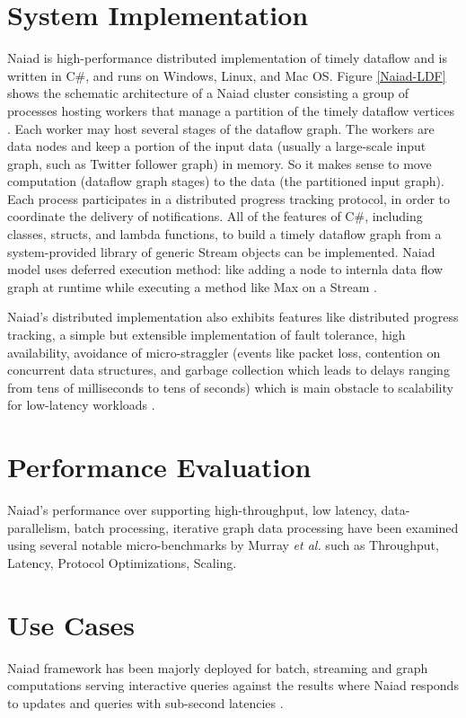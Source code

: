 \documentclass[9pt,twocolumn,twoside]{../../styles/osajnl}
\begin{document}
\section{System Implementation}
Naiad is high-performance distributed implementation of timely
dataflow and is written in C$\#$, and runs on Windows, Linux, and Mac
OS. Figure \ref{Naiad-LDF} shows the schematic architecture of a Naiad
cluster consisting a group of processes hosting workers that manage a
partition of the timely dataflow vertices \cite{paper3-Naiad}. Each
worker may host several stages of the dataflow graph. The workers are
data nodes and keep a portion of the input data (usually a large-scale
input graph, such as Twitter follower graph) in memory. So it makes
sense to move computation (dataflow graph stages) to the data (the
partitioned input
graph)\cite{www-informationage-blog-wordpress-naiad}. Each process
participates in a distributed progress tracking protocol, in order to
coordinate the delivery of notifications.  All of the features of
C$\#$, including classes, structs, and lambda functions, to build a
timely dataflow graph from a system-provided library of generic Stream
objects can be implemented. Naiad model uses deferred execution
method: like adding a node to internla data flow graph at runtime
while executing a method like Max on a Stream \cite{paper1-Naiad}.

Naiad's distributed implementation also exhibits features like
distributed progress tracking, a simple but extensible implementation
of fault tolerance, high availability, avoidance of micro-straggler
(events like packet loss, contention on concurrent data structures,
and garbage collection which leads to delays ranging from tens of
milliseconds to tens of seconds) which is main obstacle to scalability
for low-latency workloads \cite{paper1-Naiad}.

\section{Performance Evaluation}
Naiad's performance over supporting high-throughput, low latency,
data-parallelism, batch processing, iterative graph data processing
have been examined using several notable micro-benchmarks by Murray
\textit{et al.} \cite{paper1-Naiad} such as Throughput, Latency,
Protocol Optimizations, Scaling.

\section{Use Cases}
Naiad framework has been majorly deployed for batch, streaming and
graph computations serving interactive queries against the results
where Naiad responds to updates and queries with sub-second latencies
\cite{paper1-Naiad}.
\end{document}
